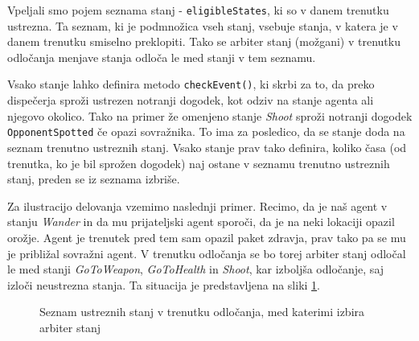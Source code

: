 \documentclass[a4paper,10pt]{article}
\begin{document}
Vpeljali smo pojem seznama stanj - \texttt{eligibleStates}, ki so v danem trenutku ustrezna. Ta seznam, ki je podmnožica vseh stanj, vsebuje stanja, v katera je v danem trenutku smiselno preklopiti. Tako se arbiter stanj (možgani) v trenutku odločanja menjave stanja odloča le med stanji v tem seznamu. 

Vsako stanje lahko definira metodo \texttt{checkEvent()}, ki skrbi za to, da preko dispečerja sproži ustrezen notranji dogodek, kot odziv na stanje agenta ali njegovo okolico. Tako na primer že omenjeno stanje \textit{Shoot} sproži notranji dogodek \texttt{OpponentSpotted} če opazi sovražnika. To ima za posledico, da se stanje doda na seznam trenutno ustreznih stanj. Vsako stanje prav tako definira, koliko časa (od trenutka, ko je bil sprožen dogodek) naj ostane v seznamu trenutno ustreznih stanj, preden se iz seznama izbriše.

Za ilustracijo delovanja vzemimo naslednji primer. Recimo, da je naš agent v stanju \textit{Wander} in da mu prijateljski agent sporoči, da je na neki lokaciji opazil orožje. Agent je trenutek pred tem sam opazil paket zdravja, prav tako pa se mu je približal sovražni agent. V trenutku odločanja se bo torej arbiter stanj odločal le med stanji \textit{GoToWeapon}, \textit{GoToHealth} in \textit{Shoot}, kar izboljša odločanje, saj izloči neustrezna stanja. Ta situacija je predstavljena na sliki \ref{fig:eligible-set-example}. 

\begin{figure}[h]
  \centering
  \caption{Seznam ustreznih stanj v trenutku odločanja, med katerimi izbira arbiter stanj}
  \label{fig:eligible-set-example}
\end{figure}
\end{document}
